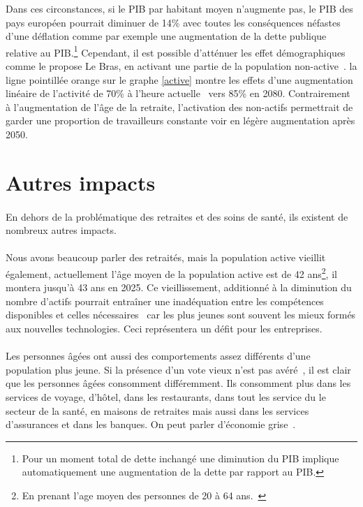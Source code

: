 Dans ces circonstances, si le PIB par habitant moyen n’augmente pas, le PIB des pays européen pourrait diminuer de 14\% avec toutes les conséquences néfastes d’une déflation comme par exemple une augmentation de la dette publique relative au PIB.\footnote{Pour un moment total de dette inchangé une diminution du PIB implique automatiquement une augmentation de la dette par rapport au PIB.} Cependant, il est possible d’atténuer les effet démographiques comme le propose Le Bras, en activant une partie de la population non-active~\citep[pp.36]{heran}. la ligne pointillée orange sur le graphe \ref{active} montre les effets d’une augmentation linéaire de l’activité de 70\% à l’heure actuelle~\citep{eurostat_emploi} vers 85\% en 2080. Contrairement à l’augmentation de l’âge de la retraite, l’activation des non-actifs permettrait de garder une proportion de travailleurs constante voir en légère augmentation après 2050. 

\section{Autres impacts}
\paragraph{}En dehors de la problématique des retraites et des soins de santé, ils existent de nombreux autres impacts. 

\paragraph{}Nous avons beaucoup parler des retraités, mais la population active vieillit également, actuellement l’âge moyen de la population active est de 42 ans\footnote{ En prenant l’age moyen des personnes de 20 à 64 ans.~\citep{eurostat_europop13}}, il montera jusqu’à 43 ans en 2025. Ce vieillissement, additionné à la diminution du nombre d’actifs pourrait entraîner une inadéquation entre les compétences disponibles et celles nécessaires~\citep[pp.10]{thesis} car les plus jeunes sont souvent les mieux formés aux nouvelles technologies. Ceci représentera un défit pour les entreprises. 

\paragraph{}Les personnes âgées ont aussi des comportements assez différents d’une population plus jeune. Si la présence d’un vote vieux n’est pas avéré~\citep[pp.10]{heran}, il est clair que les personnes âgées consomment différemment. Ils consomment plus dans les services de voyage, d’hôtel, dans les restaurants, dans tout les service du le secteur de la santé, en maisons de retraites mais aussi dans les services d'assurances et dans les banques. On peut parler d'économie grise~\citep[pp.11]{thesis}. 

